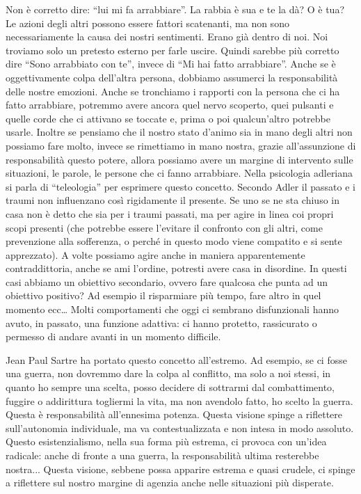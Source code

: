 \documentclass[12pt]{book} %
\begin{document}
Non è corretto dire: “lui mi fa arrabbiare”. La rabbia è sua e te la dà? O è tua? Le azioni degli altri possono essere fattori scatenanti, ma non sono necessariamente la causa dei nostri sentimenti. Erano già dentro di noi. Noi
troviamo solo un pretesto esterno per farle uscire. Quindi sarebbe più corretto dire “Sono arrabbiato con te”, invece
di “Mi hai fatto arrabbiare”. Anche se è oggettivamente colpa dell'altra persona, dobbiamo assumerci la responsabilità delle nostre emozioni. Anche se tronchiamo i rapporti con la persona che ci ha fatto arrabbiare, potremmo avere ancora quel nervo scoperto, quei pulsanti e quelle corde che ci attivano se toccate e, prima o poi qualcun'altro potrebbe usarle. Inoltre se pensiamo che il nostro stato d'animo sia in mano degli altri non possiamo fare molto, invece se rimettiamo in mano nostra, grazie all'assunzione di responsabilità questo potere, allora possiamo avere un margine di intervento sulle situazioni, le parole, le persone che ci fanno arrabbiare.
Nella psicologia adleriana si parla di “teleologia” per esprimere questo concetto.
Secondo Adler il passato e i traumi non influenzano così rigidamente il presente. Se uno se ne sta chiuso in casa non è detto che sia per i traumi
passati, ma per agire in linea coi propri scopi presenti (che potrebbe essere l'evitare il confronto
con gli altri, come prevenzione alla sofferenza, o perché in questo modo viene compatito e si sente apprezzato).
A volte possiamo agire anche in maniera apparentemente contraddittoria, anche se ami l'ordine, potresti avere casa in disordine. In questi casi abbiamo un obiettivo secondario, ovvero fare qualcosa che punta ad un obiettivo positivo? Ad esempio il risparmiare più tempo, fare altro in quel momento ecc…
Molti comportamenti che oggi ci sembrano disfunzionali hanno avuto, in passato, una funzione adattiva: ci hanno protetto, rassicurato o permesso di andare avanti in un momento difficile.

Jean Paul Sartre ha portato questo concetto all'estremo. Ad esempio, se ci fosse una guerra, non dovremmo dare la colpa al conflitto, ma solo a noi stessi, in quanto ho sempre una scelta, posso decidere di sottrarmi
dal combattimento, fuggire o addirittura togliermi la vita, ma non avendolo fatto, ho scelto la guerra. Questa è
responsabilità all'ennesima potenza. Questa visione spinge a riflettere sull’autonomia individuale, ma va contestualizzata e non intesa in modo assoluto.
Questo esistenzialismo, nella sua forma più estrema, ci provoca con un'idea radicale: anche di fronte a una guerra, la responsabilità ultima resterebbe nostra... Questa visione, sebbene possa apparire estrema e quasi crudele, ci spinge a riflettere sul nostro margine di agenzia anche nelle situazioni più disperate.
\end{document}
